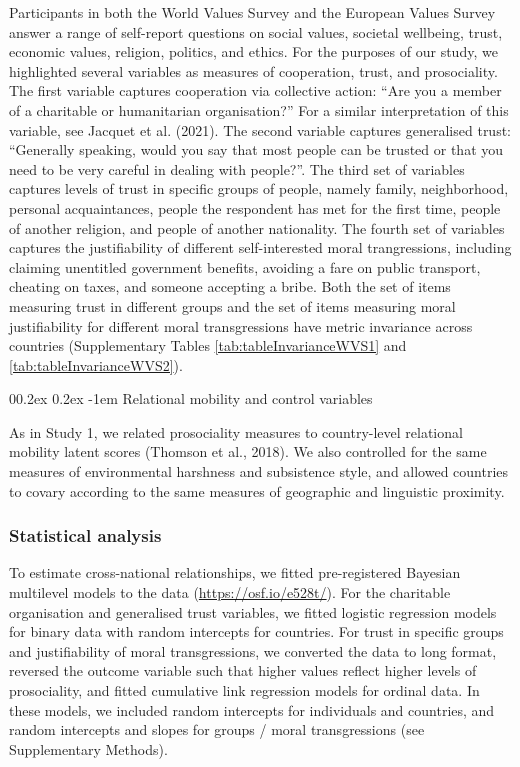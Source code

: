 \documentclass[
  man,floatsintext]{apa6}
\makeatletter
\let\oldparagraph\paragraph
\renewcommand{\paragraph}[1]{\oldparagraph{#1}\mbox{}}
\renewcommand{\paragraph}{\@startsection{paragraph}{4}{\parindent}%
  {0\baselineskip \@plus 0.2ex \@minus 0.2ex}%
  {-1em}%
  {\normalfont\normalsize\bfseries\itshape\typesectitle}}
\makeatother
\begin{document}
Participants in both the World Values Survey and the European Values Survey answer a range of self-report questions on social values, societal wellbeing, trust, economic values, religion, politics, and ethics. For the purposes of our study, we highlighted several variables as measures of cooperation, trust, and prosociality. The first variable captures cooperation via collective action: ``Are you a member of a charitable or humanitarian organisation?'' For a similar interpretation of this variable, see Jacquet et al. (2021). The second variable captures generalised trust: ``Generally speaking, would you say that most people can be trusted or that you need to be very careful in dealing with people?''. The third set of variables captures levels of trust in specific groups of people, namely family, neighborhood, personal acquaintances, people the respondent has met for the first time, people of another religion, and people of another nationality. The fourth set of variables captures the justifiability of different self-interested moral trangressions, including claiming unentitled government benefits, avoiding a fare on public transport, cheating on taxes, and someone accepting a bribe. Both the set of items measuring trust in different groups and the set of items measuring moral justifiability for different moral transgressions have metric invariance across countries (Supplementary Tables \ref{tab:tableInvarianceWVS1} and \ref{tab:tableInvarianceWVS2}).

\hypertarget{relational-mobility-and-control-variables}{%
\paragraph{Relational mobility and control variables}\label{relational-mobility-and-control-variables}}

As in Study 1, we related prosociality measures to country-level relational mobility latent scores (Thomson et al., 2018). We also controlled for the same measures of environmental harshness and subsistence style, and allowed countries to covary according to the same measures of geographic and linguistic proximity.

\hypertarget{statistical-analysis-1}{%
\subsubsection{Statistical analysis}\label{statistical-analysis-1}}

To estimate cross-national relationships, we fitted pre-registered Bayesian multilevel models to the data (\url{https://osf.io/e528t/}). For the charitable organisation and generalised trust variables, we fitted logistic regression models for binary data with random intercepts for countries. For trust in specific groups and justifiability of moral transgressions, we converted the data to long format, reversed the outcome variable such that higher values reflect higher levels of prosociality, and fitted cumulative link regression models for ordinal data. In these models, we included random intercepts for individuals and countries, and random intercepts and slopes for groups / moral transgressions (see Supplementary Methods).
\end{document}
